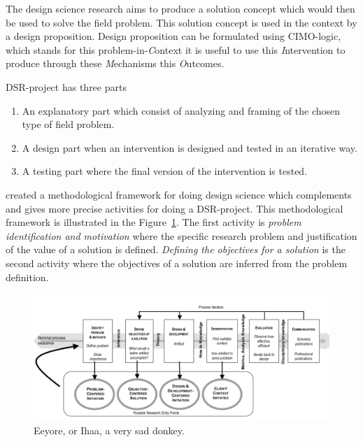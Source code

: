 The design science research aims to produce a solution concept which would then be used to solve the field problem. This solution concept is used in the context by a design proposition. Design proposition can be formulated using CIMO-logic, which stands for this problem-in-\emph{C}ontext it is useful to use this \emph{I}ntervention to produce through these \emph{M}echanisms this \emph{O}utcomes.

DSR-project has three parts \begin{enumerate}
\item An explanatory part which consist of analyzing and framing of the chosen type of field problem.
\item A design part when an intervention is designed and tested in an iterative way.
\item A testing part where the final version of the intervention is tested. \parencite{Aken:2014}
\end{enumerate}

\textcite{Peffers:2007} created a methodological framework for doing design science which complements and gives more precise activities for doing a DSR-project. This methodological framework is illustrated in the Figure~\ref{fig:dsrm-model}. The first activity is \emph{problem identification and motivation} where the specific research problem and justification of the value of a solution is defined. \emph{Defining the objectives for a solution} is the second activity where the objectives of a solution are inferred from the problem definition.

\begin{figure}[ht]
  \begin{center}
    \includegraphics[width=\textwidth]{dippa/images/DSRM-model.png}
    \caption{Eeyore, or Ihaa, a very sad donkey.}
    \label{fig:dsrm-model}
  \end{center}
\end{figure}

